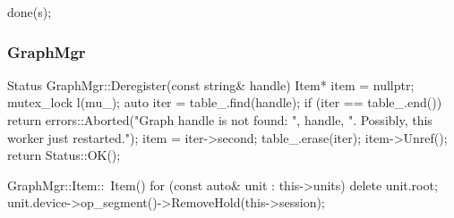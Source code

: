 \begin{content}
\begin{leftbar}
\begin{c++}
{  done(s);
}
\end{c++}
\end{leftbar}

\subsubsection{GraphMgr}

\begin{leftbar}
\begin{c++}
Status GraphMgr::Deregister(const string& handle) {
  Item* item = nullptr;
  {
    mutex_lock l(mu_);
    auto iter = table_.find(handle);
    if (iter == table_.end()) {
      return errors::Aborted("Graph handle is not found: ", handle,
                             ". Possibly, this worker just restarted.");
    }
    item = iter->second;
    table_.erase(iter);
  }
  item->Unref();
  return Status::OK();
}
\end{c++}
\end{leftbar}

\begin{leftbar}
\begin{c++}
GraphMgr::Item::~Item() {
  for (const auto& unit : this->units) {
    delete unit.root;
    unit.device->op_segment()->RemoveHold(this->session);
  }
}
\end{c++}
\end{leftbar}

\end{content}




